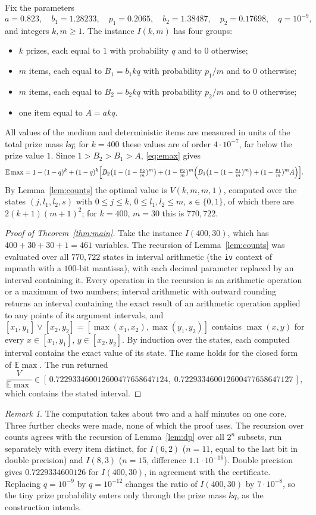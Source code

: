 \documentclass[11pt]{amsart}
\theoremstyle{remark}\newtheorem{remark}[theorem]{Remark}
\newcommand{\E}{\mathbb{E}}
\begin{document}
Fix the parameters
\[
a=0.823,\quad b_1=1.28233,\quad p_1=0.2065,\quad b_2=1.38487,\quad p_2=0.17698,\quad q=10^{-9},
\]
and integers $k,m\ge1$. The instance $I(k,m)$ has four groups:
\begin{itemize}
\item $k$ prizes, each equal to $1$ with probability $q$ and to $0$ otherwise;
\item $m$ items, each equal to $B_1=b_1kq$ with probability $p_1/m$ and to $0$ otherwise;
\item $m$ items, each equal to $B_2=b_2kq$ with probability $p_2/m$ and to $0$ otherwise;
\item one item equal to $A=akq$.
\end{itemize}
All values of the medium and deterministic items are measured in units of the total prize mass $kq$; for $k=400$ these
values are of order $4\cdot10^{-7}$, far below the prize value $1$. Since $1>B_2>B_1>A$, \eqref{eq:emax} gives
\[
\E\max=1-(1-q)^k+(1-q)^k\Bigl[B_2\bigl(1-(1-\tfrac{p_2}{m})^m\bigr)+(1-\tfrac{p_2}{m})^m\Bigl(B_1\bigl(1-(1-\tfrac{p_1}{m})^m\bigr)
+(1-\tfrac{p_1}{m})^mA\Bigr)\Bigr].
\]
By Lemma~\ref{lem:counts} the optimal value is $V(k,m,m,1)$, computed over the states $(j,l_1,l_2,s)$ with
$0\le j\le k$, $0\le l_1,l_2\le m$, $s\in\{0,1\}$, of which there are $2(k+1)(m+1)^2$; for $k=400$, $m=30$ this is
$770{,}722$.

\begin{proof}[Proof of Theorem~\ref{thm:main}]
Take the instance $I(400,30)$, which has $400+30+30+1=461$ variables. The recursion of Lemma~\ref{lem:counts} was
evaluated over all $770{,}722$ states in interval arithmetic (the \texttt{iv} context of mpmath with a $100$-bit
mantissa), with each decimal parameter replaced by an interval containing it. Every operation in the recursion is an
arithmetic operation or a maximum of two numbers; interval arithmetic with outward rounding returns an interval
containing the exact result of an arithmetic operation applied to any points of its argument intervals, and
$[x_1,y_1]\vee[x_2,y_2]=[\max(x_1,x_2),\max(y_1,y_2)]$ contains $\max(x,y)$ for every $x\in[x_1,y_1]$, $y\in[x_2,y_2]$.
By induction over the states, each computed interval contains the exact value of its state. The same holds for the
closed form of $\E\max$. The run returned
\[
\frac{V}{\E\max}\in[\,0.722933460012600477658647124,\;0.722933460012600477658647127\,],
\]
which contains the stated interval.
\end{proof}

\begin{remark}
The computation takes about two and a half minutes on one core. Three further checks were made, none of which the proof
uses. The recursion over counts agrees with the recursion of Lemma~\ref{lem:dp} over all $2^n$ subsets, run separately
with every item distinct, for $I(6,2)$ ($n=11$, equal to the last bit in double precision) and $I(8,3)$ ($n=15$,
difference $1.1\cdot10^{-16}$). Double precision gives $0.7229334600126$ for $I(400,30)$, in agreement with the
certificate. Replacing $q=10^{-9}$ by $q=10^{-12}$ changes the ratio of $I(400,30)$ by $7\cdot10^{-8}$, so the tiny prize
probability enters only through the prize mass $kq$, as the construction intends.
\end{remark}
\end{document}
